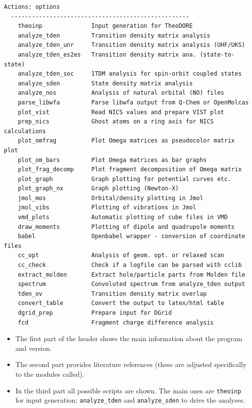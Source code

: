 \documentclass[DIV=12,headings=normal]{scrartcl}
\begin{document}
\begin{Verbatim}[commandchars=\\\{\}]
  Actions: options
  ---------------------------------------------------
    theoinp              Input generation for TheoDORE                     
    analyze_tden         Transition density matrix analysis                
    analyze_tden_unr     Transition density matrix analysis (UHF/UKS)      
    analyze_tden_es2es   Transition density matrix ana. (state-to-state)   
    analyze_tden_soc     1TDM analysis for spin-orbit coupled states       
    analyze_sden         State density matrix analysis                     
    analyze_nos          Analysis of natural orbital (NO) files            
    parse_libwfa         Parse libwfa output from Q-Chem or OpenMolcas     
    plot_vist            Read NICS values and prepare VIST plot            
    prep_nics            Ghost atoms on a ring axis for NICS calculations  
    plot_omfrag          Plot Omega matrices as pseudocolor matrix plot    
    plot_om_bars         Plot Omega matrices as bar graphs                 
    plot_frag_decomp     Plot fragment decomposition of Omega matrix       
    plot_graph           Graph plotting for potential curves etc.          
    plot_graph_nx        Graph plotting (Newton-X)                         
    jmol_mos             Orbital/density plotting in Jmol                  
    jmol_vibs            Plotting of vibrations in Jmol                    
    vmd_plots            Automatic plotting of cube files in VMD           
    draw_moments         Plotting of dipole and quadrupole moments         
    babel                Openbabel wrapper - conversion of coordinate files
    cc_opt               Analysis of geom. opt. or relaxed scan            
    cc_check             Check if a logfile can be parsed with cclib       
    extract_molden       Extract hole/particle parts from Molden file      
    spectrum             Convoluted spectrum from analyze_tden output      
    tden_ov              Transition density matrix overlap                 
    convert_table        Convert the output to latex/html table            
    dgrid_prep           Prepare input for DGrid                           
    fcd                  Fragment charge difference analysis     
\end{Verbatim}
\normalsize

\begin{itemize}
\item The first part of the header shows the main information about the program and version.
\item The second part provides literature references (these are adjusted specifically to the modules called).
\item In the third part all possible scripts are shown. The main ones are \texttt{theoinp} for input generation; \texttt{analyze\_tden} and \texttt{analyze\_sden} to drive the analyses.
\end{itemize}
\end{document}
